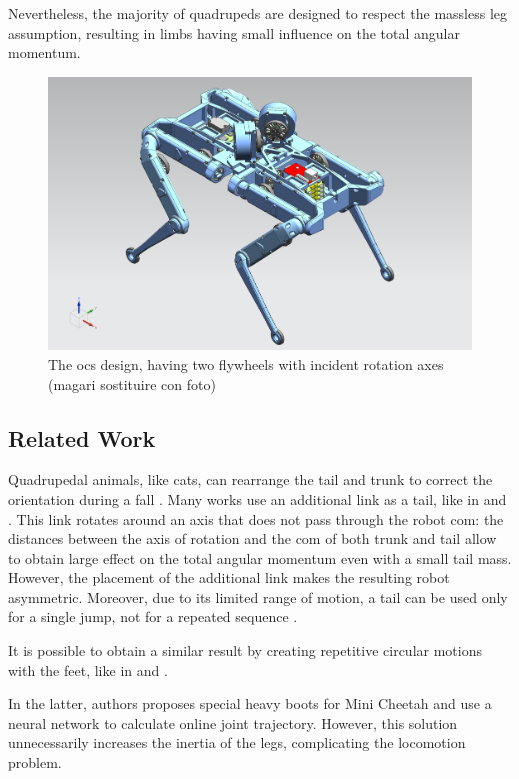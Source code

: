 \documentclass[journal,letterpaper]{IEEEtran}
\begin{document}
Nevertheless, the majority of quadrupeds are designed to respect the massless leg assumption, resulting in limbs having small influence on the total angular momentum.

\begin{figure}[t!]
	\centering
	\includegraphics[width=.7\linewidth]{figures/solo_flywheels.png}
	\caption{The \acrshort{ocs} design, having two flywheels with incident rotation axes (magari sostituire con foto)}
	\label{fig:solo12flywheels}
\end{figure} 
\subsection{Related Work}
Quadrupedal animals, like cats, can rearrange the tail and trunk to correct the orientation during a fall \cite{kane1969dynamical}.
Many works use an additional link as a tail, like in \cite{chu2019null} and \cite{wenger2016frontal}.
This link rotates around an axis that does not pass through the robot \acrshort{com}: the distances between the axis of rotation and the \acrshort{com} of both trunk and tail allow to obtain large effect on the total angular momentum even with a small tail mass.
However, the placement of the additional link makes the resulting robot asymmetric. Moreover, due to its limited range of motion, a tail can be used only for a single jump, not for a repeated sequence \cite{johnson2012tail}.

It is possible to obtain a similar result by creating repetitive circular motions with the feet, like in \cite{hoffman2021exploiting} and \cite{kurtz2021mini}.

In the latter, authors proposes special heavy boots for Mini Cheetah and use a neural network to calculate online joint trajectory. However, this solution unnecessarily increases the inertia of the legs, complicating the locomotion problem. 
\end{document}
